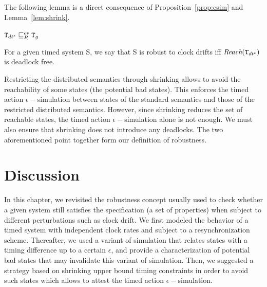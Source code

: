 The following lemma is a direct consequence of Proposition~\ref{prop:esim} and Lemma~\ref{lem:shrink}.
\begin{lemma}
  $\texttt{T}_{dt^{\epsilon}}\sqsubseteq^{\epsilon*}_{R}\texttt{T}_{g}$
\end{lemma}

\begin{definition}[Robustness]\label{def:rob}
  For a given timed system S, we say that S is robust to clock drifts iff $\textit{Reach}(\texttt{T}_{dt^{\epsilon}})$ 
  is deadlock free.
\end{definition}

Restricting the distributed semantics through shrinking allows to avoid the reachability of some states 
(the potential bad states). This enforces the timed action $\epsilon-$simulation between states
of the standard semantics and those of the restricted distributed semantics.
However, since shrinking reduces the set of reachable states, the timed action $\epsilon-$simulation
alone is not enough. We must also ensure that shrinking does not introduce any deadlocks. 
The two aforementioned point together form our definition of robustness.

\section{Discussion}

In this chapter, we revisited the robustness concept usually used to check whether a given
system still satisfies the specification (a set of properties) when subject to different
perturbations such as clock drift. We first modeled the behavior of a timed system with 
independent clock rates and subject to a resynchronization scheme. Thereafter, we used
a variant of simulation that relates states with a timing difference up to a certain $\epsilon$,
and provide a characterization of potential bad states that may invalidate this variant of 
simulation. Then, we suggested a strategy based on shrinking upper bound timing constraints
in order to avoid such states which allows to attest the timed action $\epsilon-$simulation.

